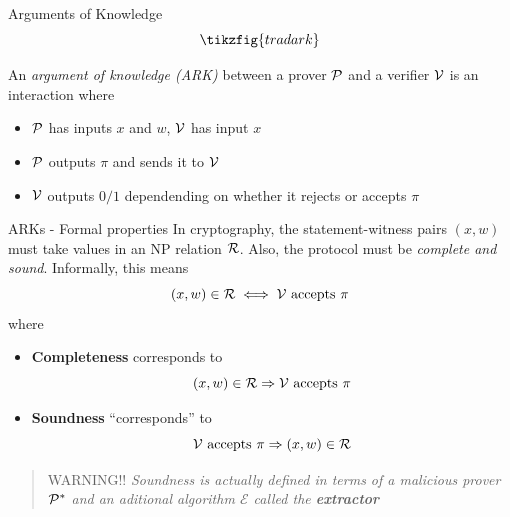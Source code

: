 \begin{frame}{Arguments of Knowledge}
	\Large
	\[
		\tikzfig{tradark}
	\]
	\normalsize
	\begin{definition}
		An \emph{argument of knowledge (ARK)} between a prover $\mathcal{P}$
		and a verifier $\mathcal{V}$ is an interaction where
		\begin{itemize}
			\item $\mathcal{P}$ has inputs $x$ and $w$, $\mathcal{V}$ has input $x$
			\item $\mathcal{P}$ outputs $\pi$ and sends it to
				$\mathcal{V}$
			\item $\mathcal{V}$ outputs $0/1$ dependending on whether
				it rejects or accepts $\pi$
		\end{itemize}
	\end{definition}
\end{frame}

\begin{frame}{ARKs - Formal properties}
	In cryptography, the statement-witness pairs $(x,w)$ must take values
	in an NP relation $\mathcal{R}$. Also, the protocol must be
	\emph{complete and sound}. Informally, this means
	\[
		(x,w) \in \mathcal{R} \iff \mbox{$\mathcal{V}$ accepts $\pi$}
	\]
	where
	\begin{itemize}
		\item \textbf{Completeness} corresponds to
			\[
				(x,w) \in \mathcal{R} \Rightarrow
				\mbox{$\mathcal{V}$ accepts $\pi$}
			\]
		\item \textbf{Soundness} ``corresponds'' to
			\[
				\mbox{$\mathcal{V}$ accepts $\pi$} \Rightarrow
				(x,w) \in \mathcal{R}
			\]
	\end{itemize}
	\begin{quote}
		WARNING!! \emph{Soundness is actually defined in terms of a malicious
		prover $\mathcal{P}^*$ and an aditional algorithm $\mathcal{E}$
		called the \textbf{extractor}}
	\end{quote}
\end{frame}

